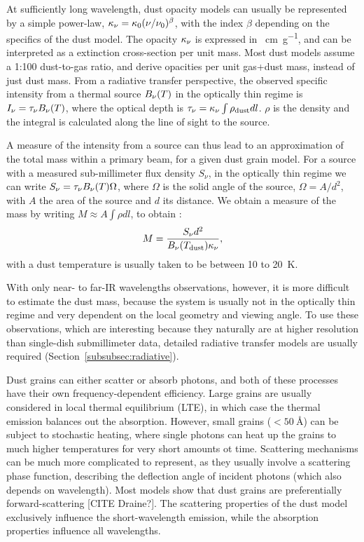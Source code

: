 At sufficiently long wavelength, dust opacity models can usually be represented by a simple power-law, $\kappa_\nu = \kappa_0(\nu/\nu_0)^\beta$, with the index $\beta$ depending on the specifics of the dust model. The opacity $\kappa_\nu$ is expressed in \si{\centi\meter\per\gram}, and can be interpreted as a extinction cross-section per unit mass. Most dust models assume a 1:100 dust-to-gas ratio, and derive opacities per unit {gas+dust} mass, instead of just dust mass. From a radiative transfer perspective, the observed specific intensity from a thermal source $B_\nu(T)$ in the optically thin regime is $I_\nu = \tau_\nu B_\nu(T)$, where the optical depth is $\tau_\nu = \Knu\int{\rho_\dust dl}$. $\rho$ is the density and the integral is calculated along the line of sight to the source. %

A measure of the intensity from a source can thus lead to an approximation of the total mass within a primary beam, for a given dust grain model. For a source with a measured sub-millimeter flux density $S_\nu$, in the optically thin regime we can write $S_\nu=\tau_\nu B_\nu(T)\Omega$, where $\Omega$ is the solid angle of the source, $\Omega = A/d^2$, with $A$ the area of the source and $d$ its distance. We obtain a measure of the mass by writing $M\approx A\int{\rho dl}$, to obtain \citep{Shirley:2000gh}:
\begin{equation}
M = \frac{S_\nu d^2}{B_\nu(T_\textrm{dust})\kappa_\nu},
\end{equation}
with a dust temperature is usually taken to be between 10 to \SI{20}{\kelvin}. 

With only near- to far-IR wavelengths observations, however, it is more difficult to estimate the dust mass, because the system is usually not in the optically thin regime and very dependent on the local geometry and viewing angle. To use these observations, which are interesting because they naturally are at higher resolution than single-dish submillimeter data, detailed radiative transfer models are usually required (Section~\ref{subsubsec:radiative}).


Dust grains can either scatter or absorb photons, and both of these processes have their own frequency-dependent efficiency. Large grains are usually considered in local thermal equilibrium (LTE), in which case the thermal emission balances out the absorption. However, small grains ($<\SI{50}{\angstrom}$) can be subject to stochastic heating, where single photons can heat up the grains to much higher temperatures for very short amounts ot time. Scattering mechanisms can be much more complicated to represent, as they usually involve a scattering phase function, describing the deflection angle of incident photons (which also depends on wavelength). Most models show that dust grains are preferentially forward-scattering [CITE Draine?]. The scattering properties of the dust model exclusively influence the short-wavelength emission, while the absorption properties influence all wavelengths. 

